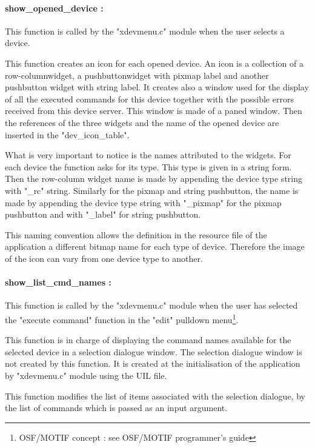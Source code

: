 
\paragraph*{show\_opened\_device : }

This function is called by the "xdevmenu.c" module when the user selects a
device. 

This function creates an icon for each opened device. An icon is a
collection of a row-column\footnotemark[1]
widget, a pushbutton\footnotemark[1] widget with pixmap
label and another pushbutton widget with string label. 
It creates also a window used for the display of all the executed commands for
this device together with the possible errors received from this device server.
This window is made of a paned window\footnotemark[1].
Then the references of the three widgets and the name of the opened device are inserted
in the "dev\_icon\_table".

What is very important to notice is the names attributed to the widgets. For
each device the function asks for its type. This type is given in a string form.
Then the row-column widget name is made by appending the device type string with
"\_rc" string. Similarly for the pixmap and string pushbutton, the name is made
by appending the device type string with "\_pixmap" for the pixmap pushbutton
and with "\_label" for string pushbutton.

This naming convention allows the definition in the resource file of the 
application a different bitmap name for each type of device. Therefore the image of the
icon can vary from one device type to another.

\paragraph*{show\_list\_cmd\_names : }

This function is called by the "xdevmenu.c" module when the user has selected
the "execute command" function in the "edit" pulldown
menu\footnote[1]{OSF/MOTIF concept : see OSF/MOTIF programmer's guide}.

This function is in charge of displaying the command names available for
the selected device in a selection dialogue window\footnotemark[1].
The selection dialogue window
is not created by this function. It is created at the initialisation of the
application by "xdevmenu.c" module using the UIL file.

This function modifies the list of items associated
with the selection dialogue, by the list of commands which is passed as an
input argument.

